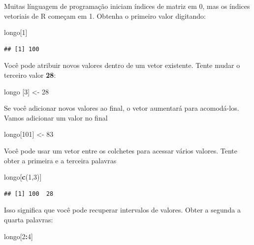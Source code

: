 \documentclass[
]{book}
\newenvironment{Shaded}{\begin{snugshade}}{\end{snugshade}}
\newcommand{\DecValTok}[1]{\textcolor[rgb]{0.00,0.00,0.81}{#1}}
\newcommand{\KeywordTok}[1]{\textcolor[rgb]{0.13,0.29,0.53}{\textbf{#1}}}
\newcommand{\NormalTok}[1]{#1}
\newcommand{\OperatorTok}[1]{\textcolor[rgb]{0.81,0.36,0.00}{\textbf{#1}}}
\newcommand{\StringTok}[1]{\textcolor[rgb]{0.31,0.60,0.02}{#1}}
\begin{document}
Muitas línguagem de programação iniciam índices de matriz em 0, mas os índices vetoriais de R começam em 1. Obtenha o primeiro valor digitando:

\begin{Shaded}
\begin{Highlighting}[]
\NormalTok{longo[}\DecValTok{1}\NormalTok{]}
\end{Highlighting}
\end{Shaded}

\begin{verbatim}
## [1] 100
\end{verbatim}

Você pode atribuir novos valores dentro de um vetor existente. Tente mudar o terceiro valor \textbf{28}:

\begin{Shaded}
\begin{Highlighting}[]
\NormalTok{longo [}\DecValTok{3}\NormalTok{] <-}\StringTok{ }\DecValTok{28}
\end{Highlighting}
\end{Shaded}

Se você adicionar novos valores ao final, o vetor aumentará para acomodá-los. Vamos adicionar um valor no final

\begin{Shaded}
\begin{Highlighting}[]
\NormalTok{longo[}\DecValTok{101}\NormalTok{] <-}\StringTok{ }\DecValTok{83}
\end{Highlighting}
\end{Shaded}

Você pode usar um vetor entre os colchetes para acessar vários valores. Tente obter a primeira e a terceira palavras

\begin{Shaded}
\begin{Highlighting}[]
\NormalTok{longo[}\KeywordTok{c}\NormalTok{(}\DecValTok{1}\NormalTok{,}\DecValTok{3}\NormalTok{)]}
\end{Highlighting}
\end{Shaded}

\begin{verbatim}
## [1] 100  28
\end{verbatim}

Isso significa que você pode recuperar intervalos de valores. Obter a segunda a quarta palavras:

\begin{Shaded}
\begin{Highlighting}[]
\NormalTok{longo[}\DecValTok{2}\OperatorTok{:}\DecValTok{4}\NormalTok{]}
\end{Highlighting}
\end{Shaded}
\end{document}
